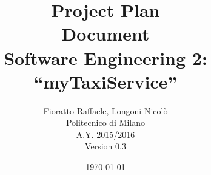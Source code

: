 \begin{figure}
  \centering
	\def\svgwidth{\columnwidth}
    \resizebox{0.66\textwidth}{!}{}
\end{figure}
\title{{\Huge \textbf{P}roject \textbf{P}lan \\ \textbf{D}ocument}\\{\Large Software Engineering 2: ``myTaxiService''}}

\author{Fioratto Raffaele, Longoni Nicol\`{o}
\\Politecnico di Milano
\\{\small A.Y. 2015/2016}
\\{\small Version 0.3}}
\date{\today}
\maketitle
\newpage
\tableofcontents
